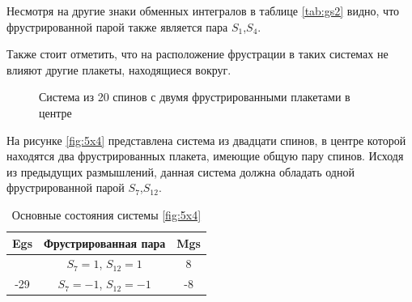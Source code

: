 \documentclass[utf8, babel, sor, jor, amsmath, amssymb, reprint]{elsarticle} %
\begin{document}
Несмотря на другие знаки обменных интегралов в таблице \eqref{tab:gs2} видно, что фрустрированной парой также является пара $S_1$,$S_4$.

Также стоит отметить, что на расположение фрустрации в таких системах  не влияют другие плакеты, находящиеся вокруг.

\begin{figure}[H]
	\centering
	\caption{Система из 20 спинов с двумя фрустрированными плакетами в центре}
	\label{fig:5x4}
\end{figure}

На рисунке \eqref{fig:5x4} представлена система из двадцати спинов, в центре которой находятся два фрустрированных плакета, имеющие общую пару спинов. Исходя из предыдущих размышлений, данная система должна обладать одной фрустрированной парой  $S_7$,$S_12$.

\begin{table}[H]
	\centering
	\begin{tabular}{|c|c|c|}
		\hline
		Egs   &   Фрустрированная пара & Mgs\\
		\hline
		 &  $S_7=1$, $S_{12}=1$ & 8 \\
	\cline{2-3}
		-29	\multirow{3}{*}{}
		  &   $S_7=-1$, $S_{12}=-1$ & -8 \\
		\hline
	\end{tabular}
	\caption{Основные состояния системы \eqref{fig:5x4}}
	\label{tab:gs3}
\end{table}
\end{document}
